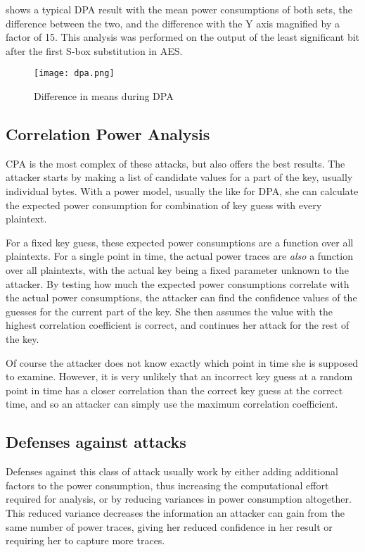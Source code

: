  shows a typical DPA result with the mean power consumptions of both sets, the difference between the two, and the difference with the Y axis magnified by a factor of 15.
This analysis was performed on the output of the least significant bit after the first S-box substitution in AES.
\begin{figure}[h]
  \centering
  \texttt{[image: dpa.png]}
  \caption{Difference in means during DPA\cite{kocher2011introduction}}
  \label{fig:dpa}
\end{figure}

\subsection{Correlation Power Analysis}
CPA is the most complex of these attacks, but also offers the best results.
The attacker starts by making a list of candidate values for a part of the key, usually individual bytes.
With a power model, usually the \hammingw{} like for DPA, she can calculate the expected power consumption for combination of key guess with every plaintext.

For a fixed key guess, these expected power consumptions are a function over all plaintexts.
For a single point in time, the actual power traces are \emph{also} a function over all plaintexts, with the actual key being a fixed parameter unknown to the attacker.
By testing how much the expected power consumptions correlate with the actual power consumptions, the attacker can find the confidence values of the guesses for the current part of the key.
She then assumes the value with the highest correlation coefficient is correct, and continues her attack for the rest of the key.

Of course the attacker does not know exactly which point in time she is supposed to examine.
However, it is very unlikely that an incorrect key guess at a random point in time has a closer correlation than the correct key guess at the correct time, and so an attacker can simply use the maximum correlation coefficient.

\subsection{Defenses against \poweranalysis{} attacks}
Defenses against this class of attack usually work by either adding additional factors to the power consumption, thus increasing the computational effort required for analysis, or by reducing variances in power consumption altogether.
This reduced variance decreases the information an attacker can gain from the same number of power traces, giving her reduced confidence in her result or requiring her to capture more traces.

